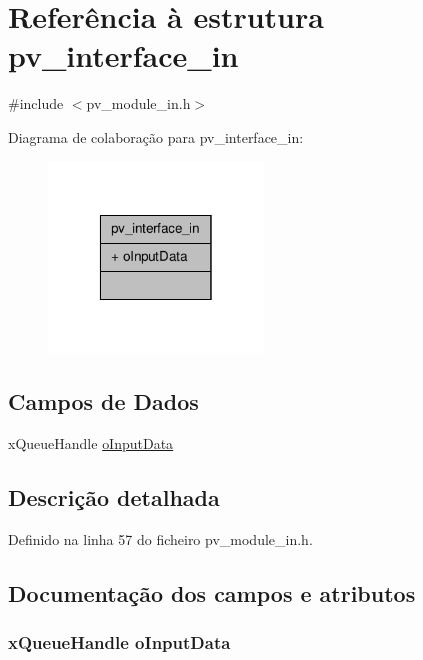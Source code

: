 \hypertarget{structpv__interface__in}{\section{Referência à estrutura pv\-\_\-interface\-\_\-in}
\label{structpv__interface__in}
}


{\ttfamily \#include $<$pv\-\_\-module\-\_\-in.\-h$>$}



Diagrama de colaboração para pv\-\_\-interface\-\_\-in\-:
\nopagebreak
\begin{figure}[H]
\begin{center}
\leavevmode
\includegraphics[width=162pt]{structpv__interface__in__coll__graph}
\end{center}
\end{figure}
\subsection*{Campos de Dados}
\begin{DoxyCompactItemize}
\item 
x\-Queue\-Handle \hyperlink{structpv__interface__in_a1b28b7bd6ca96936bf91240eea51d3b9}{o\-Input\-Data}
\end{DoxyCompactItemize}


\subsection{Descrição detalhada}


Definido na linha 57 do ficheiro pv\-\_\-module\-\_\-in.\-h.



\subsection{Documentação dos campos e atributos}
\hypertarget{structpv__interface__in_a1b28b7bd6ca96936bf91240eea51d3b9}{
\subsubsection[{o\-Input\-Data}]{\setlength{\rightskip}{0pt plus 5cm}x\-Queue\-Handle o\-Input\-Data}}\label{structpv__interface__in_a1b28b7bd6ca96936bf91240eea51d3b9}


